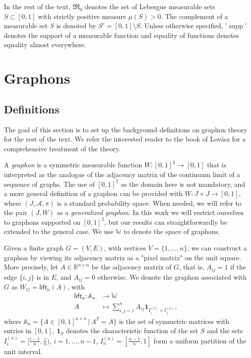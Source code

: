 \documentclass[11pt]{article}
\def\R{\mathbb{R}}
\def\supp{\operatorname{supp}}
\def\AA{\mathbb{A}}
\def\WW{\mathbb{W}}
\def\II{\bm{1}}
\def\frakM{\mathfrak{M}_0}
\newcommand{\sans}[1]{\mathsf{#1}}
\def\lift{\sans{lift}}
\theoremstyle{definition}
\begin{document}
In the rest of the text, $\frakM$ denotes the set of Lebesgue measurable sets $S \subset [0,1]$ with strictly positive measure $\mu(S) > 0$. The complement of a measurable set $S$ is denoted by $S^c = [0,1] \setminus S$. Unless otherwise specified, '$\supp$' denotes the support of a measurable function and equality of functions denotes equality almost everywhere.

\section{Graphons}\label{sec:graphons}

\subsection{Definitions} \label{sec:definitions}

The goal of this section is to set up the background definitions on graphon theory for the rest of the text. We refer the interested reader to the book of Lovász \cite{lovaszGraphon2012} for a comprehensive treatment of the theory.

A \textit{graphon} is a symmetric measurable function $W : [0,1]^2 \rightarrow [0,1]$ that is interpreted as the analogue of the adjacency matrix of the continuum limit of a sequence of graphs. The use of $[0,1]^2$ as the domain here is not mandatory, and a more general definition of a graphon can be provided with $W: J \times J \rightarrow [0,1]$, where $(J,\mathcal{A},\pi)$ is a standard probability space. When needed, we will refer to the pair $(J,W)$ as a \textit{generalized graphon}. In this work we will restrict ourselves to graphons supported on $[0,1]^2$, but our results can straightforwardly be extended to the general case. We use $\WW$ to denote the space of graphons.

Given a finite graph $G = (V,E)$, with vertices $V = \{1,\dots,n\}$, we can construct a graphon by viewing its adjacency matrix as a "pixel matrix" on the unit square. More precisely, let $A \in \R^{n\times n}$ be the adjacency matrix of $G$, that is, $A_{ij} = 1$ if the edge $\{i,j\}$ is in $E$, and $A_{ij} = 0$ otherwise. We denote the graphon associated with $G$ as $W_G = \lift_n (A) $, with
\begin{align*}
 \lift_n : \AA_n &\rightarrow \WW \\
 A & \mapsto \sum_{i,j=1}^n A_{ij} \II_{I^{(n)}_i \times I^{(n)}_j},
\end{align*}
where $\AA_n = \{A\in [0,1]^{n\times n}\,|\, A^T=A\}$ is the set of symmetric matrices with entries in $[0,1]$, $\II_S$ denotes the characteristic function of the set $S$ and the sets $I^{(n)}_i = [\frac{i-1}{n},\frac{i}{n})$, $i=1,\dots,n-1$, $I^{(n)}_n = [\frac{n-1}{n},1]$ form a uniform partition of the unit interval.
\end{document}
